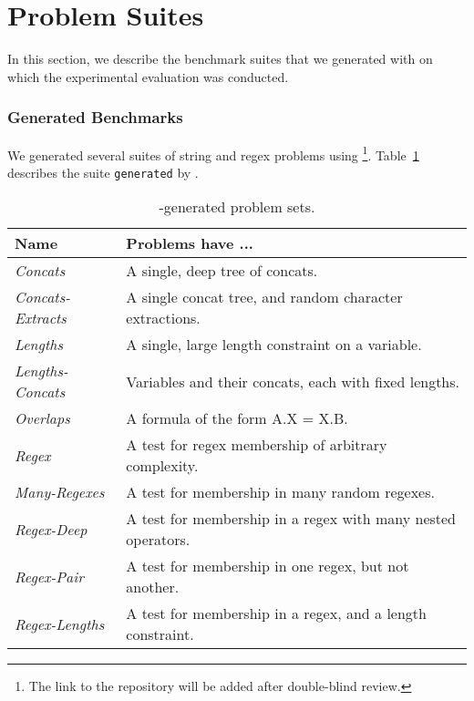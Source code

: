 \section{Problem Suites}
\label{sec:problems}

In this section, we describe the benchmark suites that we generated
with \fuzzer{} on which the experimental evaluation was conducted.

\subsubsection{Generated Benchmarks}

We generated several suites
of string and regex problems using \fuzzer{}\footnote{The link to the
repository will be added after double-blind review.}.
Table~\ref{tbl:generated} describes the suite
\texttt{generated} by \generator{}.
\begin{table}[H]
    \centering
    \caption{\generator{}-generated problem sets.}
    \label{tbl:generated}
    \begin{tabular}{|l|l|}
        \hline
        \textbf{Name}             & \textbf{Problems have ...} \\ \hline
        \textit{Concats}          & A single, deep tree of concats. \\ \hline
        \textit{Concats-Extracts} & A single concat tree, and random character extractions. \\ \hline
        \textit{Lengths}          & A single, large length constraint on a variable. \\ \hline
        \textit{Lengths-Concats}  & Variables and their concats, each with fixed lengths. \\ \hline
        \textit{Overlaps}         & A formula of the form A.X = X.B. \\ \hline
        \textit{Regex}            & A test for regex membership of arbitrary complexity. \\ \hline
        \textit{Many-Regexes}     & A test for membership in many random regexes. \\ \hline
        \textit{Regex-Deep}       & A test for membership in a regex with many nested operators. \\ \hline
        \textit{Regex-Pair}       & A test for membership in one regex, but not another. \\ \hline
        \textit{Regex-Lengths}    & A test for membership in a regex, and a length constraint. \\ \hline
    \end{tabular}
\end{table}

